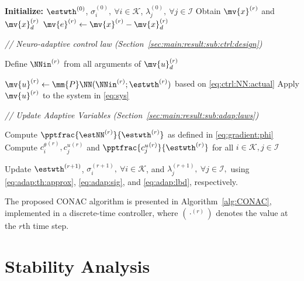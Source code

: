 \documentclass[letterpaper, journal]{IEEEtran}
\begin{document}
\begin{algorithm}[!t]
  \caption{Proposed CONAC}\label{alg:CONAC}
  \begin{algorithmic}[1]
    \STATE \textbf{Initialize:} $\estwth^{(0)}$, $\sigma_i^{(0)},\ \forall i\in\mathcal{K}$, $\lambda_j^{(0)},\ \forall j\in\mathcal{I}$
      \STATE Obtain $\mv{x}^{(r)}$ and $\mv{x}_d^{(r)}$
      \STATE $\mv{e}^{(r)}\leftarrow\mv{x}^{(r)}-\mv{x}_d^{(r)}$

      \STATE \textit{// Neuro-adaptive control law (Section~\ref{sec:main:result:sub:ctrl:design})}

        \STATE Define $\NNin^{(r)}$ from all arguments of $\mv{u}_d^{(r)}$

        \STATE $\mv{u}^{(r)}\leftarrow\mm{P}\NN(\NNin^{(r)};\estwth^{(r)}) $ based on \eqref{eq:ctrl:NN:actual}
        \STATE Apply $\mv{u}^{(r)}$ to the system in \eqref{eq:sys}

      \STATE \textit{// Update Adaptive Variables (Section~\ref{sec:main:result:sub:adap:laws})}

      \STATE Compute $\pptfrac{\estNN^{(r)}}{\estwth^{(r)}}$ as defined in \eqref{eq:gradient:phi}
      \STATE Compute ${c^{\theta}_i}^{(r)},{c^{u}_j}^{(r)}$ and $\pptfrac{{c^{u}_{j}}^{(r)}}{\estwth^{(r)}}$ for all $i\in\mathcal{K}, j\in\mathcal{I}$
      
      \STATE Update $\estwth^{(r+1)}$, $\sigma_i^{(r+1)},\ \forall i\in\mathcal{K}$, and $\lambda_j^{(r+1)},\ \forall j\in\mathcal{I},$ using \eqref{eq:adap:th:approx}, \eqref{eq:adap:sig}, and \eqref{eq:adap:lbd}, respectively.
    \ENDFOR
  \end{algorithmic}
\end{algorithm}

The proposed CONAC algorithm is presented in Algorithm~\ref{alg:CONAC}, implemented in a discrete-time controller, where $(\cdot^{(r)})$ denotes the value at the $r$th time step.

\section{Stability Analysis} \label{sec:stability:analysis}
\end{document}
